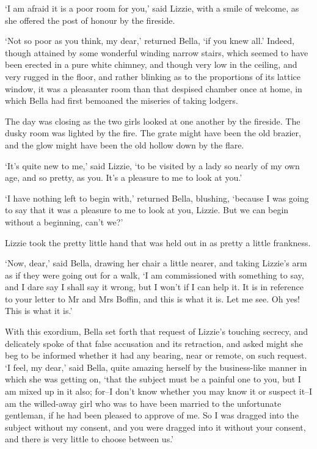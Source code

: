 ‘I am afraid it is a poor room for you,’ said Lizzie, with a smile of
welcome, as she offered the post of honour by the fireside.

‘Not so poor as you think, my dear,’ returned Bella, ‘if you knew all.’
Indeed, though attained by some wonderful winding narrow stairs, which
seemed to have been erected in a pure white chimney, and though very low
in the ceiling, and very rugged in the floor, and rather blinking as
to the proportions of its lattice window, it was a pleasanter room than
that despised chamber once at home, in which Bella had first bemoaned
the miseries of taking lodgers.

The day was closing as the two girls looked at one another by the
fireside. The dusky room was lighted by the fire. The grate might have
been the old brazier, and the glow might have been the old hollow down
by the flare.

‘It’s quite new to me,’ said Lizzie, ‘to be visited by a lady so nearly
of my own age, and so pretty, as you. It’s a pleasure to me to look at
you.’

‘I have nothing left to begin with,’ returned Bella, blushing, ‘because
I was going to say that it was a pleasure to me to look at you, Lizzie.
But we can begin without a beginning, can’t we?’

Lizzie took the pretty little hand that was held out in as pretty a
little frankness.

‘Now, dear,’ said Bella, drawing her chair a little nearer, and taking
Lizzie’s arm as if they were going out for a walk, ‘I am commissioned
with something to say, and I dare say I shall say it wrong, but I
won’t if I can help it. It is in reference to your letter to Mr and Mrs
Boffin, and this is what it is. Let me see. Oh yes! This is what it is.’

With this exordium, Bella set forth that request of Lizzie’s touching
secrecy, and delicately spoke of that false accusation and its
retraction, and asked might she beg to be informed whether it had any
bearing, near or remote, on such request. ‘I feel, my dear,’ said Bella,
quite amazing herself by the business-like manner in which she was
getting on, ‘that the subject must be a painful one to you, but I
am mixed up in it also; for--I don’t know whether you may know it or
suspect it--I am the willed-away girl who was to have been married to
the unfortunate gentleman, if he had been pleased to approve of me. So
I was dragged into the subject without my consent, and you were dragged
into it without your consent, and there is very little to choose between
us.’

